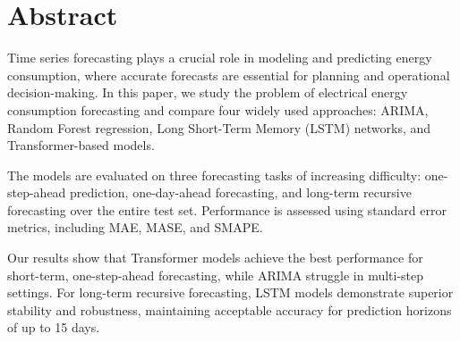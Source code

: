 
\section*{Abstract}

Time series forecasting plays a crucial role in modeling and predicting energy consumption, where accurate forecasts are essential for planning and operational decision-making. In this paper, we study the problem of electrical energy consumption forecasting and compare four widely used approaches: ARIMA, Random Forest regression, Long Short-Term Memory (LSTM) networks, and Transformer-based models.
\par
The models are evaluated on three forecasting tasks of increasing difficulty: one-step-ahead prediction, one-day-ahead forecasting, and long-term recursive forecasting over the entire test set. Performance is assessed using standard error metrics, including MAE, MASE, and SMAPE.
\par
Our results show that Transformer models achieve the best performance for short-term, one-step-ahead forecasting, while ARIMA struggle in multi-step settings. For long-term recursive forecasting, LSTM models demonstrate superior stability and robustness, maintaining acceptable accuracy for prediction horizons of up to 15 days.





